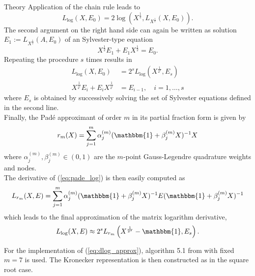 \begin{chapter}{Theory}
Application of the chain rule leads to
\begin{equation}
    L_{\log}(X,E_0) = 2\log\left(X^{\frac{1}{2}},L_{X^{\frac{1}{2}}}(X,E_0)\right).
\end{equation}
The second argument on the right hand side can again be written as solution $E_1:=L_{X^{\frac{1}{2}}}(A,E_0)$ of an Sylvester-type equation
\begin{equation}
    X^{\frac{1}{2}}E_1+E_{1}X^{\frac{1}{2}}=E_0.
\end{equation}
Repeating the procedure $s$ times results in
\begin{align}
    L_{\log}(X,E_0)&=2^sL_{\log}\left(X^{\frac{1}{2^s}},E_s\right)\\
    X^{\frac{1}{2^{i}}}E_i+E_iX^{\frac{1}{2^{i}}}&=E_{i-1},\quad i=1,\ldots,s
\end{align}
where $E_s$ is obtained by successively solving the set of Sylvester equations defined in the second line.\\

Finally, the Pad\'{e} approximant of order $m$ in its partial fraction form \cite{HighamPade} is given by
\begin{equation}
    \label{eq:pade_log}
    r_m(X) = \sum_{j=1}^{m}\alpha_j^{(m)}(\mathbbm{1}+\beta_j^{(m)}X)^{-1}X
\end{equation}
where $\alpha_{j}^{(m)},\beta_{j}^{(m)}\in (0,1)$ are the $m$-point Gauss-Legendre quadrature weights and nodes.\\

The derivative of (\ref{eq:pade_log}) is then easily computed as 
\begin{equation}
    L_{r_m}(X,E) = \sum_{j=1}^m\alpha_j^{(m)}(\mathbbm{1}+\beta_j^{(m)}X)^{-1}E(\mathbbm{1}+\beta_j^{(m)}X)^{-1}
\end{equation}
which leads to the final approximation of the matrix logarithm derivative, 
\begin{equation}
    \label{eq:dlog_approx}
    L_{\log}(X,E)\approx 2^{s}L_{r_m}\left(X^{\frac{1}{2^s}}-\mathbbm{1},E_s \right).
\end{equation}

For the implementation of (\ref{eq:dlog_approx}), algorithm 5.1 from \cite{AlmohyFrechet} with fixed $m=7$ is used.
The Kronecker representation is then constructed as in the square root case.








\end{chapter}
